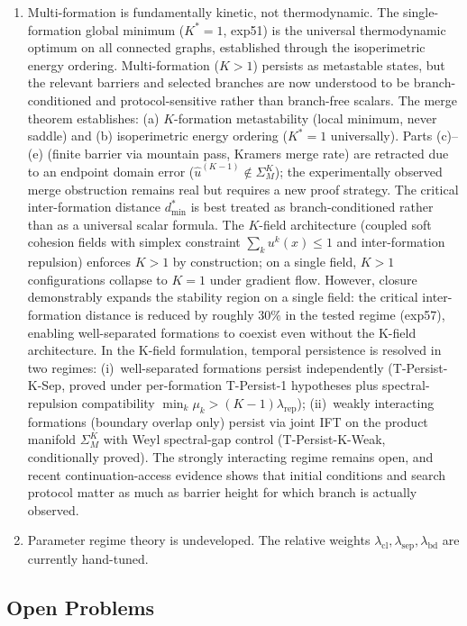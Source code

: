\documentclass[lettersize,journal]{IEEEtran}
\begin{document}
\begin{enumerate}
\item Multi-formation is fundamentally kinetic, not thermodynamic. The single-formation global minimum ($K^* = 1$, exp51) is the universal thermodynamic optimum on all connected graphs, established through the isoperimetric energy ordering. Multi-formation ($K > 1$) persists as metastable states, but the relevant barriers and selected branches are now understood to be branch-conditioned and protocol-sensitive rather than branch-free scalars. The merge theorem establishes: (a) $K$-formation metastability (local minimum, never saddle) and (b) isoperimetric energy ordering ($K^* = 1$ universally). Parts (c)--(e) (finite barrier via mountain pass, Kramers merge rate) are retracted due to an endpoint domain error ($\hat{u}^{(K-1)} \notin \Sigma^K_M$); the experimentally observed merge obstruction remains real but requires a new proof strategy. The critical inter-formation distance $d_{\min}^*$ is best treated as branch-conditioned rather than as a universal scalar formula. The $K$-field architecture (coupled soft cohesion fields with simplex constraint $\sum_k u^k(x) \leq 1$ and inter-formation repulsion) enforces $K > 1$ by construction; on a single field, $K > 1$ configurations collapse to $K=1$ under gradient flow. However, closure demonstrably expands the stability region on a single field: the critical inter-formation distance is reduced by roughly $30\%$ in the tested regime (exp57), enabling well-separated formations to coexist even without the K-field architecture. In the K-field formulation, temporal persistence is resolved in two regimes: (i)~well-separated formations persist independently (T-Persist-K-Sep, proved under per-formation T-Persist-1 hypotheses plus spectral-repulsion compatibility $\min_k \mu_k > (K{-}1)\lambda_{\mathrm{rep}}$); (ii)~weakly interacting formations (boundary overlap only) persist via joint IFT on the product manifold $\Sigma^K_M$ with Weyl spectral-gap control (T-Persist-K-Weak, conditionally proved). The strongly interacting regime remains open, and recent continuation-access evidence shows that initial conditions and search protocol matter as much as barrier height for which branch is actually observed.

\item Parameter regime theory is undeveloped. The relative weights $\lambda_{\mathrm{cl}}, \lambda_{\mathrm{sep}}, \lambda_{\mathrm{bd}}$ are currently hand-tuned.
\end{enumerate}

\subsection{Open Problems}
\end{document}
